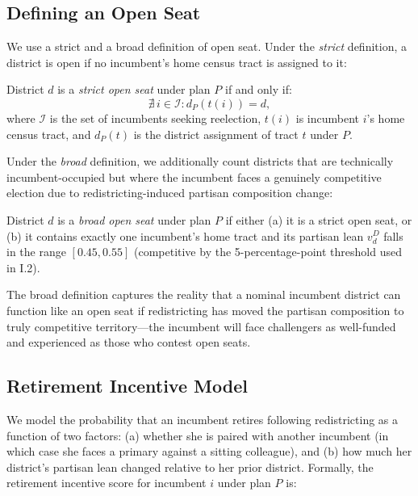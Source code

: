 \label{sec:background}

\subsection{Defining an Open Seat}

We use a strict and a broad definition of open seat. Under the \textit{strict} definition,
a district is open if no incumbent's home census tract is assigned to it:

\begin{definition}
District $d$ is a \emph{strict open seat} under plan $P$ if and only if:
\[
  \nexists\, i \in \mathcal{I} : d_P(t(i)) = d,
\]
where $\mathcal{I}$ is the set of incumbents seeking reelection, $t(i)$ is incumbent
$i$'s home census tract, and $d_P(t)$ is the district assignment of tract $t$ under $P$.
\end{definition}

Under the \textit{broad} definition, we additionally count districts that are
technically incumbent-occupied but where the incumbent faces a genuinely competitive
election due to redistricting-induced partisan composition change:

\begin{definition}
District $d$ is a \emph{broad open seat} under plan $P$ if either (a) it is a strict
open seat, or (b) it contains exactly one incumbent's home tract and its partisan lean
$v_d^D$ falls in the range $[0.45, 0.55]$ (competitive by the 5-percentage-point
threshold used in I.2).
\end{definition}

The broad definition captures the reality that a nominal incumbent district can
function like an open seat if redistricting has moved the partisan composition to
truly competitive territory---the incumbent will face challengers as well-funded and
experienced as those who contest open seats.

\subsection{Retirement Incentive Model}

We model the probability that an incumbent retires following redistricting as a
function of two factors: (a) whether she is paired with another incumbent (in which
case she faces a primary against a sitting colleague), and (b) how much her district's
partisan lean changed relative to her prior district. Formally, the retirement
incentive score for incumbent $i$ under plan $P$ is:

